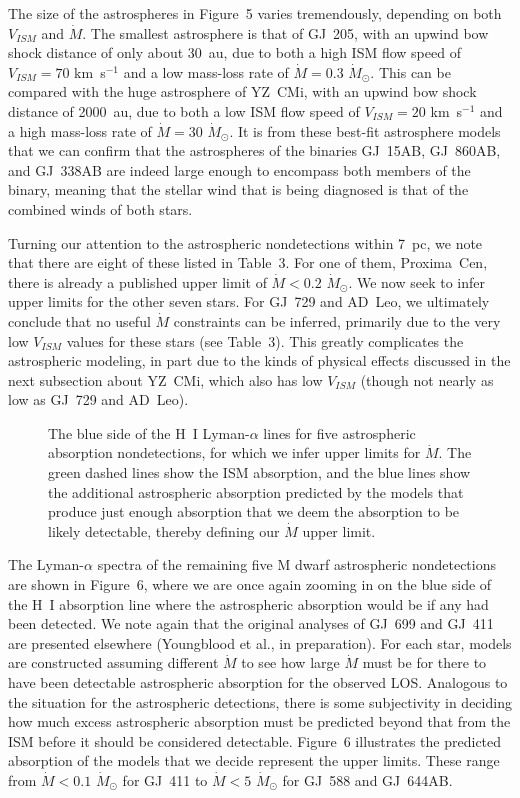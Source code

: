 \documentclass[preprint]{aastex}
\begin{document}
     The size of the astrospheres in Figure~5 varies
tremendously, depending on both $V_{ISM}$ and $\dot{M}$.
The smallest astrosphere is that of GJ~205, with an
upwind bow shock distance of only about 30~au, due to
both a high ISM flow speed of $V_{ISM}=70$ km~s$^{-1}$
and a low mass-loss rate of $\dot{M}=0.3$ $\dot{M}_{\odot}$.
This can be compared with the huge astrosphere of YZ~CMi,
with an upwind bow shock distance of 2000~au, due to
both a low ISM flow speed of $V_{ISM}=20$ km~s$^{-1}$
and a high mass-loss rate of $\dot{M}=30$ $\dot{M}_{\odot}$.
It is from these best-fit astrosphere models that we can
confirm that the astrospheres of the binaries GJ~15AB,
GJ~860AB, and GJ~338AB are indeed large enough to encompass
both members of the binary, meaning that the stellar wind
that is being diagnosed is that of the combined winds of
both stars.

     Turning our attention to the astrospheric
nondetections within 7~pc, we note that there are eight of
these listed in Table~3.  For one of them, Proxima~Cen, there
is already a published upper limit of
$\dot{M}<0.2$ $\dot{M}_{\odot}$.  We now seek to infer
upper limits for the other seven stars.  For GJ~729 and
AD~Leo, we ultimately conclude that no useful $\dot{M}$
constraints can be inferred, primarily due to the very low
$V_{ISM}$ values for these stars (see Table~3).  This greatly
complicates the astrospheric modeling, in part due to the
kinds of physical effects discussed in the next subsection
about YZ~CMi, which also has low $V_{ISM}$ (though not
nearly as low as GJ~729 and AD~Leo).

\begin{figure}[t]
\caption{The blue side of the H~I Lyman-$\alpha$ lines for
  five astrospheric absorption nondetections, for which we
  infer upper limits for $\dot{M}$.  The green dashed
  lines show the ISM absorption, and the blue lines show the
  additional astrospheric absorption predicted by the models
  that produce just enough absorption that we deem the
  absorption to be likely detectable, thereby defining our
  $\dot{M}$ upper limit.}
\end{figure}
     The Lyman-$\alpha$ spectra of the remaining five
M dwarf astrospheric nondetections are shown in Figure~6,
where we are once again zooming in on the blue side of
the H~I absorption line where the astrospheric absorption
would be if any had been detected.  We note again that
the original analyses of GJ~699 and GJ~411 are presented
elsewhere (Youngblood et al., in preparation).  For each star,
models are constructed assuming different $\dot{M}$ to see how
large $\dot{M}$ must be for there to have been detectable
astrospheric absorption for the observed LOS.
Analogous to the situation for the astrospheric
detections, there is some subjectivity in deciding
how much excess astrospheric absorption must be predicted
beyond that from the ISM before it should be considered
detectable.  Figure~6 illustrates the predicted absorption of
the models that we decide represent the upper limits.
These range from $\dot{M}<0.1$ $\dot{M}_{\odot}$ for GJ~411 to
$\dot{M}<5$ $\dot{M}_{\odot}$ for GJ~588 and
GJ~644AB.
\end{document}
